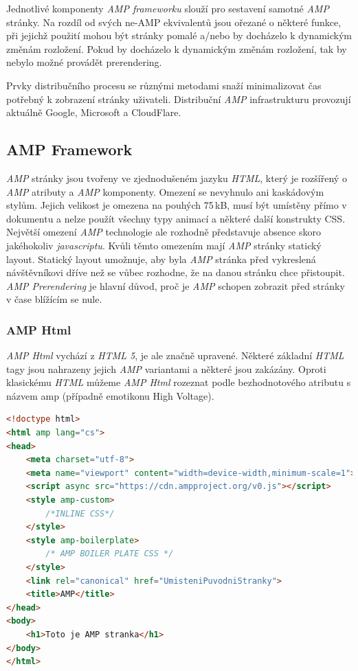 Jednotlivé komponenty \emph{AMP frameworku} slouží pro sestavení samotné \emph{AMP} stránky. Na rozdíl od svých
ne-AMP ekvivalentů jsou ořezané o některé funkce, při jejichž použití mohou být stránky pomalé a/nebo
by docházelo k dynamickým změnám rozložení. Pokud by docházelo k dynamickým změnám rozložení,
tak by nebylo možné provádět prerendering.


Prvky distribučního procesu se různými metodami snaží minimalizovat čas potřebný k zobrazení stránky
uživateli. Distribuční \emph{AMP} infrastrukturu provozují aktuálně Google, Microsoft a CloudFlare\cite[Ch.\ 1, p.\ 49]{VzhuruDoAMP}.

\subsection*{AMP Framework}
\emph{AMP} stránky jsou tvořeny ve zjednodušeném jazyku \emph{HTML}, který je rozšířený o \emph{AMP} atributy a \emph{AMP}
komponenty. Omezení se nevyhnulo ani kaskádovým stylům. Jejich velikost je omezena na pouhých
75\,kB, musí být umístěny přímo v dokumentu a nelze použít všechny typy animací a některé další
konstrukty CSS.
Největší omezení \emph{AMP} technologie ale rozhodně představuje absence skoro jakéhokoliv \emph{javascriptu}.
Kvůli těmto omezením mají \emph{AMP} stránky statický layout. Statický layout umožnuje, aby byla \emph{AMP} stránka před vykreslená návštěvníkovi dříve než se vůbec rozhodne, že na danou stránku chce přistoupit. \emph{AMP Prerendering} je hlavní důvod, proč je \emph{AMP} schopen zobrazit před stránky v čase blížícím se nule\cite{AMP-zero}.
\subsubsection*{AMP Html}
\emph{AMP Html} vychází z \emph{HTML 5}, je ale značně upravené. Některé základní \emph{HTML} tagy jsou nahrazeny jejich \emph{AMP} variantami a některé jsou zakázány.
Oproti klasickému \emph{HTML} můžeme \emph{AMP Html} rozeznat podle bezhodnotového atributu s názvem amp (případně emotikonu High Voltage).

\begin{lstlisting}[language=html, caption=Ukázka AMP Html,captionpos=t]
<!doctype html>
<html amp lang="cs">
<head>
    <meta charset="utf-8">
    <meta name="viewport" content="width=device-width,minimum-scale=1">
    <script async src="https://cdn.ampproject.org/v0.js"></script>
    <style amp-custom>
        /*INLINE CSS*/
    </style>
    <style amp-boilerplate>
        /* AMP BOILER PLATE CSS */
    </style>
    <link rel="canonical" href="UmisteniPuvodniStranky">
    <title>AMP</title>
</head>
<body>
    <h1>Toto je AMP stranka</h1>
</body>
</html>

\end{lstlisting}

